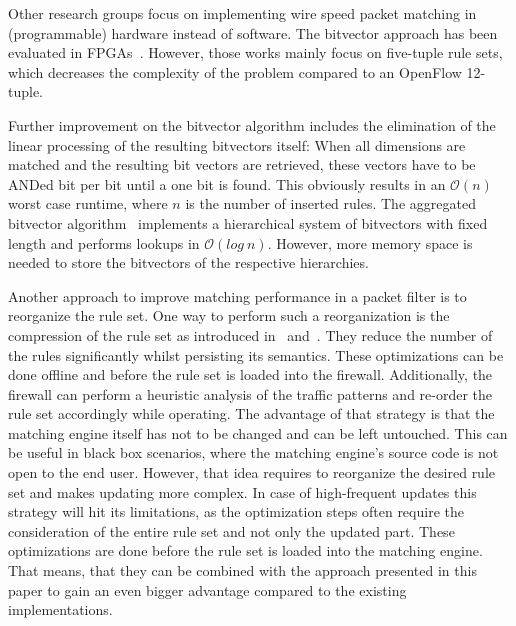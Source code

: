 \documentclass[a4paper,
		12pt,
		parskip=full,
		titlepage
		]{scrartcl}
\begin{document}
Other research groups focus on implementing wire speed packet matching in (programmable) hardware instead of software.
The bitvector approach has been evaluated in FPGAs~\cite{bitvector_fpga, qu2013fast}.
However, those works mainly focus on five-tuple rule sets, which decreases 
the complexity of the problem compared to an OpenFlow 12-tuple.

Further improvement on the bitvector algorithm includes the elimination of the linear processing of the resulting bitvectors itself:
When all dimensions are matched and the resulting bit vectors are retrieved, 
these vectors have to be ANDed bit per bit until a one bit is found.
This obviously results in an $\mathcal O(n)$ worst case runtime, where $n$ is the number of inserted rules.
The aggregated bitvector algorithm~\cite{abv} implements a hierarchical system 
of bitvectors with fixed length and performs lookups in $\mathcal O(log\ n)$.
However, more memory space is needed to store the bitvectors of the respective hierarchies.

Another approach to improve matching performance in a packet filter is to reorganize the rule set.
One way to perform such a reorganization is the compression of the rule set as 
introduced in~\cite{firewall_compressor} and~\cite{redundancy_removal}.
They reduce the number of the rules significantly whilst persisting its semantics.
These optimizations can be done offline and before the rule set is loaded into the firewall.
Additionally, the firewall can perform a heuristic analysis of the traffic patterns and re-order the rule set accordingly while operating.
The advantage of that strategy is that the matching engine itself has not to be changed and can be left untouched.
This can be useful in black box scenarios, where the matching engine's source code is not open to the end user.
However, that idea requires to reorganize the desired rule set and makes updating more complex.
In case of high-frequent updates this strategy will hit its limitations, 
as the optimization steps often require the consideration of the entire rule set and not only the updated part.
These optimizations are done before the rule set is loaded into the matching engine.
That means, that they can be combined with the approach presented in this paper to
gain an even bigger advantage compared to the existing implementations.
\end{document}
